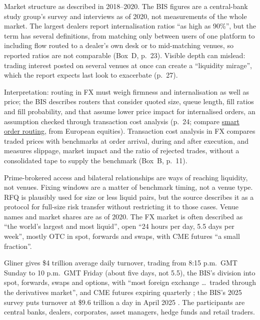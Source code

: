 \begin{qfdefinition}
 Market structure as described in 2018--2020. The BIS figures are a central-bank study group's survey and interviews as of 2020, not measurements of the whole market. The largest dealers report internalisation ratios ``as high as 90\%'', but the term has several definitions, from matching only between users of one platform to including flow routed to a dealer's own desk or to mid-matching venues, so reported ratios are not comparable (Box~D, p.~23). Visible depth can mislead: trading interest posted on several venues at once can create a ``liquidity mirage'', which the report expects last look to exacerbate (p.~27).

 Interpretation: routing in FX must weigh firmness and internalisation as well as price; the BIS describes routers that consider quoted size, queue length, fill ratios and fill probability, and that assume lower price impact for internalised orders, an assumption checked through transaction cost analysis (p.~24; compare \hyperref[def:smart-order-routing]{smart order routing}, from European equities). Transaction cost analysis in FX compares traded prices with benchmarks at order arrival, during and after execution, and measures slippage, market impact and the ratio of rejected trades, without a consolidated tape to supply the benchmark (Box~B, p.~11).

 Prime-brokered access and bilateral relationships are ways of reaching liquidity, not venues. Fixing windows are a matter of benchmark timing, not a venue type. RFQ is plausibly used for size or less liquid pairs, but the source describes it as a protocol for full-size risk transfer without restricting it to those cases. Venue names and market shares are as of 2020. The FX market is often described as ``the world's largest and most liquid'', open ``24 hours per day, 5.5 days per week'', mostly OTC in spot, forwards and swaps, with CME futures ``a small fraction''.

Gliner gives \$4 trillion average daily turnover, trading from 8:15 p.m.\ GMT Sunday to 10 p.m.\ GMT Friday (about five days, not 5.5), the BIS's division into spot, forwards, swaps and options, with ``most foreign exchange \dots\ traded through the derivatives market'', and CME futures expiring quarterly \citep[chap.~7, opening and sec.\ ``Trading Currencies'', PDF pp.~179 and 182--184]{s7-gliner}; the BIS's 2025 survey puts turnover at \$9.6 trillion a day in April 2025 \citep[preliminary results]{bis-triennial-2025}. The participants are central banks, dealers, corporates, asset managers, hedge funds and retail traders.


\end{qfdefinition}
